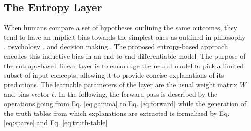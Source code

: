 \subsection{The Entropy Layer}
When humans compare a set of hypotheses outlining the same outcomes, they tend to have an implicit bias towards the simplest ones as outlined in philosophy \citep{soklakov2002occam,rathmanner2011philosophical},
psychology \citep{miller1956magical,cowan2001magical}, and decision making \citep{simon1956rational,simon1957models,simon1979rational}.
The proposed entropy-based approach encodes this inductive bias in an end-to-end differentiable model. The purpose of the entropy-based linear layer is to encourage the neural model to pick a limited subset of input concepts, allowing it to provide concise explanations of its predictions. The learnable parameters of the layer are the usual weight matrix $W$ and bias vector $b$. In the following, the forward pass is described by the operations going from Eq. \ref{eq:gamma} to Eq. \ref{eq:forward}
while %
the generation of the truth tables from which explanations are extracted 
is formalized by %
Eq. \ref{eq:sparse} and Eq. \ref{eq:truth-table}.


